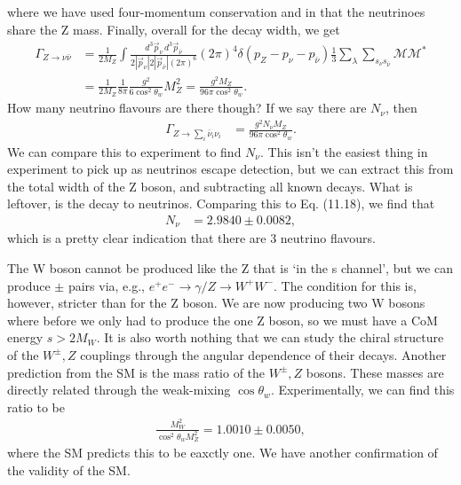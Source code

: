 \documentclass[relqm.tex]{subfiles}
\begin{document}
where we have used four-momentum conservation and in that the neutrinoes share the Z mass. 
Finally, overall for the decay width, we get
\begin{align}
    \Gamma_{Z\to\nu\bar{\nu}} &= \frac{1}{2M_Z}\int \frac{d^3\vec{p}_\nu\,d^3\vec{p}_{\bar{\nu}}}{2|\vec{p}_\nu|2|\vec{p}_{\bar{\nu}}|(2\pi)^6} (2\pi)^4\delta(p_Z-p_\nu-p_{\bar{\nu}})\frac13\sum_{\lambda}\sum_{s_\nu s_{\bar{\nu}}} \mathcal{M}\mathcal{M}^* \\
                              &= \frac{1}{2M_Z}\frac{1}{8\pi}\frac{g^2}{6\cos^2\theta_w}M_Z^2 = \frac{g^2 M_Z}{96\pi \cos^2\theta_w}.
\end{align}
How many neutrino flavours are there though?
If we say there are $N_\nu$, then
\begin{align}
    \Gamma_{Z\to\sum_i\bar{\nu}_i\nu_i} &= \frac{g^2 N_\nu M_Z}{96\pi\cos^2\theta_w}.
\end{align}
We can compare this to experiment to find $N_\nu$.
This isn't the easiest thing in experiment to pick up as neutrinos escape detection, but we can extract this from the total width of the Z boson, and subtracting all known decays. 
What is leftover, is the decay to neutrinos. 
Comparing this to Eq. (11.18), we find that 
\begin{align}
    N_\nu &= 2.9840 \pm 0.0082,
\end{align}
which is a pretty clear indication that there are 3 neutrino flavours. 

The W boson cannot be produced like the Z that is `in the s channel', but we can produce $\pm$ pairs via, e.g., $e^+e^-\to\gamma/Z\to W^+W^-$.
The condition for this is, however, stricter than for the Z boson. 
We are now producing two W bosons where before we only had to produce the one Z boson, so we must have a CoM energy $s>2M_W$.
It is also worth nothing that we can study the chiral structure of the $W^\pm,Z$ couplings through the angular dependence of their decays. 
Another prediction from the SM is the mass ratio of the $W^\pm,Z$ bosons. 
These masses are directly related through the weak-mixing $\cos\theta_w$.
Experimentally, we can find this ratio to be
\begin{align}
    \frac{M_W^2}{\cos^2\theta_w M_Z^2} = 1.0010\pm0.0050,
\end{align}
where the SM predicts this to be eaxctly one. 
We have another confirmation of the validity of the SM. 
\end{document}
